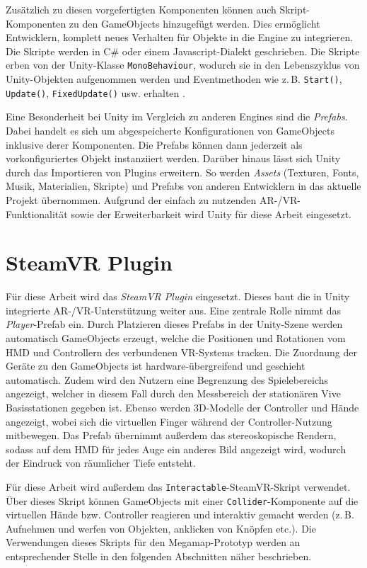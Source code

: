 Zusätzlich zu diesen vorgefertigten Komponenten können auch Skript-Komponenten zu den GameObjects hinzugefügt werden.
Dies ermöglicht Entwicklern, komplett neues Verhalten für Objekte in die Engine zu integrieren.
Die Skripte werden in C\# oder einem Javascript-Dialekt geschrieben.
Die Skripte erben von der Unity-Klasse \lstinline|MonoBehaviour|, wodurch sie in den Lebenszyklus von Unity-Objekten aufgenommen werden und Eventmethoden wie z.\,B. \lstinline|Start()|, \lstinline|Update()|, \lstinline|FixedUpdate()| usw. erhalten \parencite{UnityTechnologies2018c}.

Eine Besonderheit bei Unity im Vergleich zu anderen Engines sind die \emph{Prefabs}.
Dabei handelt es sich um abgespeicherte Konfigurationen von GameObjects inklusive derer Komponenten.
Die Prefabs können dann jederzeit als vorkonfiguriertes Objekt instanziiert werden.
Darüber hinaus lässt sich Unity durch das Importieren von Plugins erweitern.
So werden \emph{Assets} (Texturen, Fonts, Musik, Materialien, Skripte) und Prefabs von anderen Entwicklern in das aktuelle Projekt übernommen.
Aufgrund der einfach zu nutzenden AR-/VR-Funktionalität sowie der Erweiterbarkeit wird Unity für diese Arbeit eingesetzt.

\section{SteamVR Plugin}
Für diese Arbeit wird das \emph{SteamVR Plugin} \autocite{ValveCorporation2018} eingesetzt.
Dieses baut die in Unity integrierte AR-/VR-Unterstützung weiter aus.
Eine zentrale Rolle nimmt das \emph{Player}-Prefab ein.
Durch Platzieren dieses Prefabs in der Unity-Szene werden automatisch GameObjects erzeugt, welche die Positionen und Rotationen vom HMD und Controllern des verbundenen VR-Systems tracken.
Die Zuordnung der Geräte zu den GameObjects ist hardware-übergreifend und geschieht automatisch.
Zudem wird den Nutzern eine Begrenzung des Spielebereichs angezeigt, welcher in diesem Fall durch den Messbereich der stationären Vive Basisstationen gegeben ist.
Ebenso werden 3D-Modelle der Controller und Hände angezeigt, wobei sich die virtuellen Finger während der Controller-Nutzung mitbewegen.
Das Prefab übernimmt außerdem das stereoskopische Rendern, sodass auf dem HMD für jedes Auge ein anderes Bild angezeigt wird, wodurch der Eindruck von räumlicher Tiefe entsteht.

Für diese Arbeit wird außerdem das \lstinline{Interactable}-SteamVR-Skript verwendet.
Über dieses Skript können GameObjects mit einer \lstinline{Collider}-Komponente auf die virtuellen Hände bzw. Controller reagieren und interaktiv gemacht werden (z.\,B. Aufnehmen und werfen von Objekten, anklicken von Knöpfen etc.).
Die Verwendungen dieses Skripts für den Megamap-Prototyp werden an entsprechender Stelle in den folgenden Abschnitten näher beschrieben.

